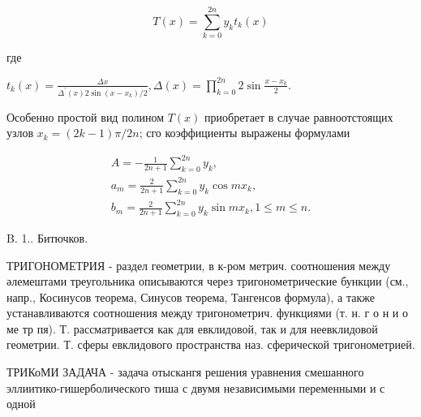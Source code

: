 \documentclass[10pt]{article}
\begin{document}
\[

T(x)=\sum_{k=0}^{2 n} y_{k} t_{k}(x)

\]



где



$t_{k}(x)=\frac{\Delta x}{\Delta^{\prime}(x) 2 \sin \left(x-x_{k}\right) / 2}, \Delta(x)=\prod_{k=0}^{2 n} 2 \sin \frac{x-x_{k}}{2}$.



Особенно простой вид полином $T(x)$ приобретает в случае равноотстоящих узлов $x_{k}=(2 k-1) \pi / 2 n$; сго коэффициенты выражены формулами



\[

\begin{gathered}

A=-\frac{1}{2 n+1} \sum_{k=0}^{2 n} y_{k}, \\

a_{m}=\frac{2}{2 n+1} \sum_{k=0}^{2 n} y_{k} \cos m x_{k}, \\

b_{m}=\frac{2}{2 n+1} \sum_{k=0}^{2 n} y_{k} \sin m x_{k}, 1 \leqslant m \leqslant n .

\end{gathered}

\]



B. 1.. Битючков.



ТРИГОНОМЕТРИЯ - раздел геометрии, в к-ром метрич. соотношения между әлемештами треугольника описываются через тригонометрические бункции (см., напр., Косинусов теорема, Синусов теорема, Тангенсов формула), а также устанавливаются соотношения между тригонометрич. функциями (т. н. г о н и о ме тр пя). Т. рассматривается как для евклидовой, так и для неевклидовой геометрии. Т. сферы евклидового пространства наз. сферической тригонометрией.



ТРИКоМИ ЗАДАЧА - задача отыскангя решения уравнения смешанного эллиитико-гишерболического тиша с двумя независимыми переменными и с одной
\end{document}
